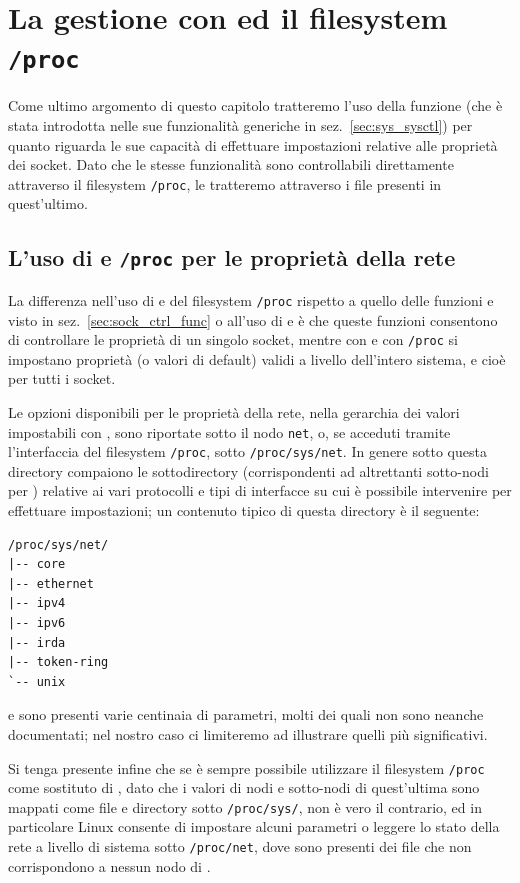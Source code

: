 \section{La gestione con  ed il filesystem \texttt{/proc}}
\label{sec:sock_sysctl_proc}

Come ultimo argomento di questo capitolo tratteremo l'uso della funzione
 (che è stata introdotta nelle sue funzionalità generiche in
sez.~\ref{sec:sys_sysctl}) per quanto riguarda le sue capacità di effettuare
impostazioni relative alle proprietà dei socket.  Dato che le stesse
funzionalità sono controllabili direttamente attraverso il filesystem
\texttt{/proc}, le tratteremo attraverso i file presenti in quest'ultimo.


\subsection{L'uso di  e \texttt{/proc} per le proprietà della
  rete}
\label{sec:sock_sysctl}

La differenza nell'uso di  e del filesystem \texttt{/proc}
rispetto a quello delle funzioni  e  visto in
sez.~\ref{sec:sock_ctrl_func} o all'uso di  e
 è che queste funzioni consentono di controllare le proprietà
di un singolo socket, mentre con  e con \texttt{/proc} si
impostano proprietà (o valori di default) validi a livello dell'intero
sistema, e cioè per tutti i socket.

Le opzioni disponibili per le proprietà della rete, nella gerarchia dei valori
impostabili con , sono riportate sotto il nodo \texttt{net}, o,
se acceduti tramite l'interfaccia del filesystem \texttt{/proc}, sotto
\texttt{/proc/sys/net}. In genere sotto questa directory compaiono le
sottodirectory (corrispondenti ad altrettanti sotto-nodi per )
relative ai vari protocolli e tipi di interfacce su cui è possibile
intervenire per effettuare impostazioni; un contenuto tipico di questa
directory è il seguente:
\begin{verbatim}
/proc/sys/net/
|-- core
|-- ethernet
|-- ipv4
|-- ipv6
|-- irda
|-- token-ring
`-- unix
\end{verbatim}
e sono presenti varie centinaia di parametri, molti dei quali non sono neanche
documentati; nel nostro caso ci limiteremo ad illustrare quelli più
significativi.

Si tenga presente infine che se è sempre possibile utilizzare il filesystem
\texttt{/proc} come sostituto di , dato che i valori di nodi e
sotto-nodi di quest'ultima sono mappati come file e directory sotto
\texttt{/proc/sys/}, non è vero il contrario, ed in particolare Linux consente
di impostare alcuni parametri o leggere lo stato della rete a livello di
sistema sotto \texttt{/proc/net}, dove sono presenti dei file che non
corrispondono a nessun nodo di .


